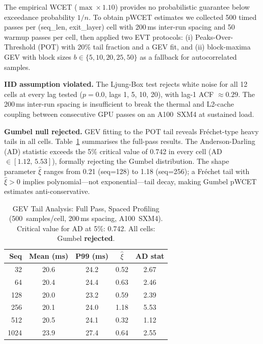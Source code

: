 \documentclass[conference]{IEEEtran}
\begin{document}
The empirical WCET ($\max \times 1.10$) provides no probabilistic
guarantee below exceedance probability $1/n$.
To obtain pWCET estimates we collected 500 timed passes per
(seq\_len, exit\_layer) cell with 200\,ms inter-run spacing
and 50 warmup passes per cell, then applied two EVT protocols:
(i) Peaks-Over-Threshold (POT) with 20\% tail fraction and a GEV fit,
and (ii) block-maxima GEV with block sizes $b\in\{5,10,20,25,50\}$ as a
fallback for autocorrelated samples.

\textbf{IID assumption violated.}
The Ljung-Box test rejects white noise for all 12 cells at every lag
tested ($p{=}0.0$, lags 1, 5, 10, 20), with lag-1 ACF $\approx 0.29$.
The 200\,ms inter-run spacing is insufficient to break the thermal and
L2-cache coupling between consecutive GPU passes on an A100~SXM4 at
sustained load.

\textbf{Gumbel null rejected.}
GEV fitting to the POT tail reveals Fréchet-type heavy tails in all cells.
Table~\ref{tab:evt} summarises the full-pass results.
The Anderson-Darling (AD) statistic exceeds the 5\% critical value of
0.742 in every cell (AD $\in [1.12,\,5.53]$), formally rejecting the
Gumbel distribution.
The shape parameter $\hat{\xi}$ ranges from 0.21 (seq=128) to 1.18
(seq=256); a Fréchet tail with $\hat{\xi} > 0$ implies polynomial---not
exponential---tail decay, making Gumbel pWCET estimates anti-conservative.

\begin{table}[htbp]
\caption{GEV Tail Analysis: Full Pass, Spaced Profiling
         (500~samples/cell, 200\,ms spacing, A100~SXM4).
         Critical value for AD at 5\%: 0.742.
         All cells: Gumbel \textbf{rejected}.}
\centering
\setlength{\tabcolsep}{3pt}
\begin{tabular}{@{}rcccc@{}}
\toprule
\textbf{Seq} & \textbf{Mean (ms)} & \textbf{P99 (ms)}
             & $\hat{\xi}$ & \textbf{AD stat} \\
\midrule
32  & 20.6 & 24.2 & 0.52 & 2.67 \\
64  & 20.4 & 24.4 & 0.63 & 2.46 \\
128 & 20.0 & 23.2 & 0.59 & 2.39 \\
256 & 20.1 & 24.0 & 1.18 & 5.53 \\
512 & 20.5 & 24.1 & 0.32 & 1.12 \\
1024& 23.9 & 27.4 & 0.64 & 2.55 \\
\bottomrule
\end{tabular}
\label{tab:evt}
\end{table}
\end{document}
